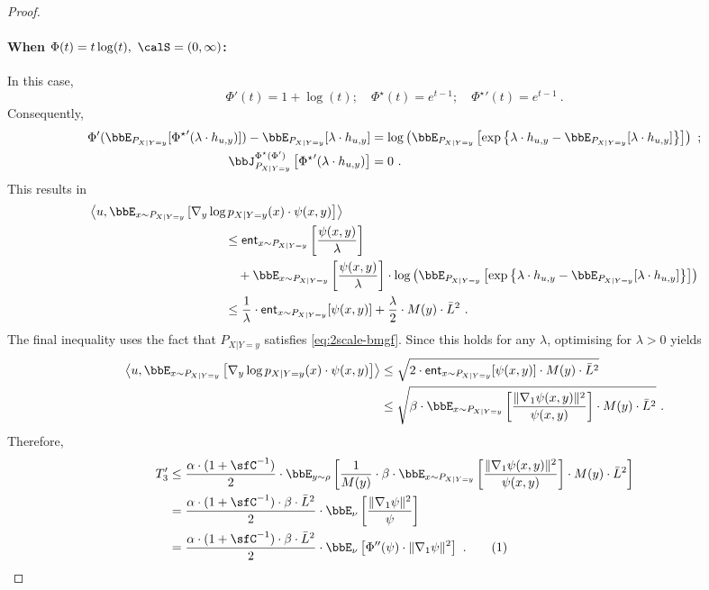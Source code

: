 \documentclass[11pt]{article}
\newcounter{ct}
\newcommand{\numberthis}{\addtocounter{equation}{1}\tag{\theequation}}
\newcommand{\Phient}[3]{
    \ensuremath{\if$#3$\bbJ_{#1}^{#2}\else\bbJ_{#1}^{#2}\left[#3\right]\fi}}
\newcommand{\ent}{\mathsf{ent}}
\begin{document}
\begin{proof}
\paragraph{When \(\Phi(t) = t\log(t),~\calS = (0, \infty)\): }
In this case,
\begin{equation*}
    \Phi'(t) = 1 + \log(t); \quad \Phi^{\star}(t) = e^{t - 1}; \quad {\Phi^{\star}}'(t) = e^{t- 1}~.
\end{equation*}
Consequently,
\begin{align*}
    \Phi'(\bbE_{P_{X | Y = y}}[{\Phi^{\star}}'(\lambda \cdot h_{u, y})]) - \bbE_{P_{X | Y = y}}[\lambda \cdot h_{u, y}] &= \log\left(\bbE_{P_{X | Y = y}}\left[\exp\left\{\lambda \cdot h_{u, y} - \bbE_{P_{X | Y = y}}[\lambda \cdot h_{u, y}]\right\}\right]\right)~;\\
    \Phient{P_{X | Y= y}}{\Phi^{\star}(\Phi')}{{\Phi^{\star}}'(\lambda \cdot h_{u, y})} &= 0~.
\end{align*}
This results in
\begin{align*}
    \left\langle u, \bbE_{x \sim P_{X | Y = y}}\left[\nabla_{y}\log  \!\!\right.\right. & \!\!\!\left.\left.\phantom{{}_{{}_{|}}} p_{X | Y = y}(x) \cdot\psi(x, y) \right]\right\rangle \\
    &\leq \ent{}_{x \sim P_{X | Y = y}}\left[\frac{\psi(x, y)}{\lambda}\right] \\
    &\quad + \bbE_{x \sim P_{X | Y = y}}\left[\frac{\psi(x, y)}{\lambda}\right] \cdot \log\left(\bbE_{P_{X | Y = y}}\left[\exp\left\{\lambda \cdot h_{u, y} - \bbE_{P_{X | Y = y}}[\lambda \cdot h_{u, y}]\right\}\right]\right) \\
    &\leq \frac{1}{\lambda} \cdot \ent{}_{x \sim P_{X | Y = y}}[\psi(x, y)] + \frac{\lambda}{2} \cdot M(y) \cdot \bar{L}^{2}~.
\end{align*}
The final inequality uses the fact that \(P_{X | Y = y}\) satisfies \ref{eq:2scale-bmgf}.
Since this holds for any \(\lambda\), optimising for \(\lambda > 0\) yields
\begin{align*}
    \left\langle u, \bbE_{x \sim P_{X | Y = y}}\left[\nabla_{y}\log p_{X | Y = y}(x) \cdot \psi(x, y) \right]\right\rangle &\leq \sqrt{2 \cdot \ent{}_{x \sim P_{X | Y = y}}[\psi(x, y)] \cdot M(y) \cdot \bar{L}^{2}} \\
    &\leq \sqrt{\beta \cdot \bbE_{x \sim P_{X | Y = y}}\left[\frac{\|\nabla_{1}\psi(x, y)\|^{2}}{\psi(x, y)}\right] \cdot M(y) \cdot \bar{L}^{2}}~.
\end{align*}
Therefore,
\begin{align*}
    T_{3}' &\leq \frac{\alpha \cdot (1 + \sfC^{-1})}{2} \cdot \bbE_{y \sim \rho}\left[\frac{1}{M(y)} \cdot \beta \cdot \bbE_{x \sim P_{X | Y = y}}\left[\frac{\|\nabla_{1}\psi(x, y)\|^{2}}{\psi(x, y)}\right] \cdot M(y) \cdot \bar{L}^{2}\right] \\
    &= \frac{\alpha \cdot (1 + \sfC^{-1}) \cdot \beta \cdot \bar{L}^{2}}{2} \cdot \bbE_{\nu}\left[\frac{\|\nabla_{1}\psi\|^{2}}{\psi}\right] \\
    &= \frac{\alpha \cdot (1 + \sfC^{-1}) \cdot \beta \cdot \bar{L}^{2}}{2} \cdot \bbE_{\nu}\left[\Phi''(\psi) \cdot \|\nabla_{1}\psi\|^{2}\right]~.\numberthis\label{eq:T3dash-bound-lsi}
\end{align*}


\end{proof}
\end{document}
